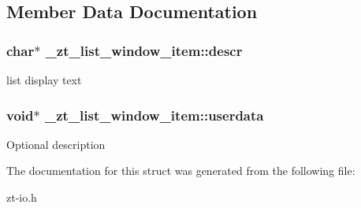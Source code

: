\subsection{Member Data Documentation}
\hypertarget{struct__zt__list__window__item_afd12505b917bdc36aea5f57cbcda905f}{
\subsubsection[{descr}]{\setlength{\rightskip}{0pt plus 5cm}char$\ast$ \-\_\-zt\-\_\-list\-\_\-window\-\_\-item\-::descr}}\label{struct__zt__list__window__item_afd12505b917bdc36aea5f57cbcda905f}
list display text \hypertarget{struct__zt__list__window__item_a3413a3b8542a17b9f7194a504f96f600}{
\subsubsection[{userdata}]{\setlength{\rightskip}{0pt plus 5cm}void$\ast$ \-\_\-zt\-\_\-list\-\_\-window\-\_\-item\-::userdata}}\label{struct__zt__list__window__item_a3413a3b8542a17b9f7194a504f96f600}
Optional description 

The documentation for this struct was generated from the following file\-:\begin{DoxyCompactItemize}
\item 
zt-\/io.\-h\end{DoxyCompactItemize}
